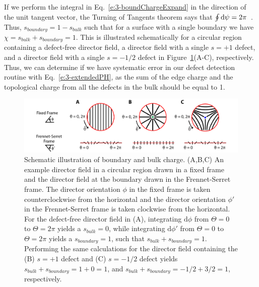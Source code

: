 If we perform the integral in Eq.~\ref{e:3-boundChargeExpand} in the direction of the unit tangent vector, the Turning of Tangents theorem says that $ \oint \textup{d}\psi = 2\pi$~\cite{RN35}.
Thus, $s_{boundary} = 1 - s_{bulk}$ such that for a surface with a single boundary we have $\chi = s_{bulk} + s_{boundary} = 1$.
This is illustrated schematically for a circular region containing a defect-free director field, a director field with a single $s = +1$ defect, and a director field with a single $s=-1/2$ defect in Figure~\ref{f:3-EdgeChargeEx}(A-C), respectively.
Thus, we can determine if we have systematic error in our defect detection routine with Eq.~\ref{e:3-extendedPH}, as the sum of the edge charge and the topological charge from all the defects in the bulk should be equal to 1.
\begin{figure}
  \centering
  \includegraphics{figures/C3/Ch3-Figs_EdgeChargeEx.png}
  \caption{Schematic illustration of boundary and bulk charge.
  (A,B,C) An example director field in a circular region drawn in a fixed frame and the director field at the boundary drawn in the Frennet-Serret frame.
  The director orientation $\phi$ in the fixed frame is taken counterclockwise from the horizontal and the director orientation $\phi'$ in the Frennet-Serret frame is taken clockwise from the horizontal.
  For the defect-free director field in (A), integrating $\textrm{d}\phi$ from $\Theta = 0$ to $\Theta = 2\pi$ yields a $s_{bulk} = 0$, while integrating $\textrm{d}\phi'$ from $\Theta = 0$ to $\Theta = 2\pi$ yields a $s_{boundary} = 1$, such that $s_{bulk} + s_{boundary}=1$.
  Performing the same calculations for the director field containing the (B) $s = +1$ defect and (C) $s = -1/2$ defect yields $s_{bulk} + s_{boundary}= 1 + 0= 1$, and $s_{bulk} + s_{boundary}= -1/2 + 3/2 = 1$, respectively.}\label{f:3-EdgeChargeEx}
\end{figure}

